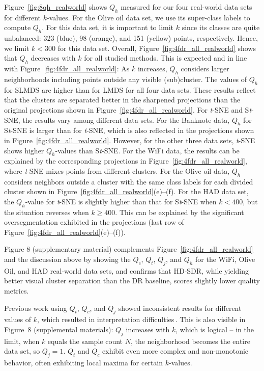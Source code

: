\documentclass[sagev,Afour,times]{sagej}
\begin{document}
Figure~\ref{fig:8qh_realworld} shows $Q_h$ measured for our four real-world data sets for different $k$-values. For the Olive oil data set, we use its super-class labels to compute $Q_h$. For this data set, it is important to limit $k$ since its classes are quite unbalanced: 323 (blue), 98 (orange), and 151 (yellow) points, respectively. Hence, we limit $k<300$ for this data set. Overall, Figure~\ref{fig:4fdr_all_realworld} shows that $Q_h$ decreases with $k$ for all studied methods. This is expected and in line with Figure~\ref{fig:4fdr_all_realworld}: As $k$ increases, $Q_h$ considers larger neighborhoods including points outside any visible (sub)cluster. The values of $Q_h$ for SLMDS are higher than for LMDS for all four data sets. These results reflect that the clusters are separated better in the sharpened projections than the original projections shown in Figure~\ref{fig:4fdr_all_realworld}. For \emph{t}-SNE and S\emph{t}-SNE, the results vary among different data sets. For the Banknote data, $Q_h$ for S\emph{t}-SNE is larger than for \emph{t}-SNE, which is also reflected in the projections shown in Figure~\ref{fig:4fdr_all_realworld}. However, for the other three data sets, \emph{t}-SNE shows higher $Q_h$-values than S\emph{t}-SNE. For the WiFi data, the results can be explained by the corresponding projections in Figure~\ref{fig:4fdr_all_realworld}, where \emph{t}-SNE mixes points from different clusters. For the Olive oil data, $Q_h$ considers neighbors outside a cluster with the same class labels for each divided cluster shown in Figure~\ref{fig:4fdr_all_realworld}(e)--(f). For the HAD data set, the $Q_h$-value for \emph{t}-SNE is slightly higher than that for S\emph{t}-SNE when $k<400$, but the situation reverses when $k \geq 400$. This can be explained by the significant oversegmentation exhibited in the projections (last row of Figure~\ref{fig:4fdr_all_realworld}(e)--(f)).

Figure 8 (supplementary material) complements Figure~\ref{fig:4fdr_all_realworld} and the discussion above by showing the $Q_c$, $Q_t$, $Q_j$, and $Q_{h}$ for the WiFi, Olive Oil, and HAD real-world data sets, and confirms that HD-SDR, while yielding better visual cluster separation than the DR baseline, scores slightly lower quality metrics.

Previous work using $Q_t$, $Q_c$, and $Q_j$ showed inconsistent results for different values of $k$, which resulted in interpretation difficulties\,\cite{trustworthiness_orig, jaccard_martins2015}. This is also visible in Figure~8 (supplemental materials): $Q_j$ increases with $k$, which is logical -- in the limit, when $k$ equals the sample count $N$, the neighborhood becomes the entire data set, so $Q_j=1$. $Q_t$ and $Q_c$ exhibit even more complex and non-monotonic behavior, often exhibiting local maxima for certain $k$-values.
\end{document}
